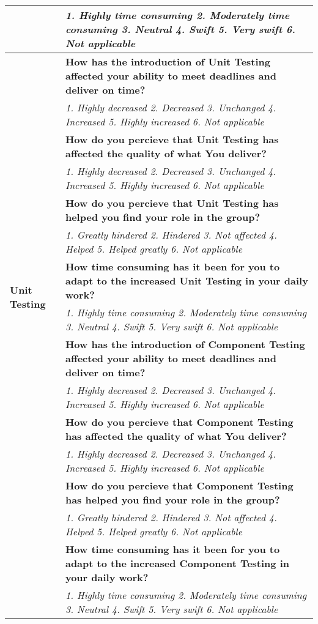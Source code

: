 \documentclass[final_report_innit.tex]{subfiles}
\begin{document}
\begin{center}
\begin{tabular}[b]{| p{4.5cm} | p{13cm} |}
	& \textit{1. Highly time consuming 2. Moderately time consuming 3. Neutral 4. Swift 5. Very swift 6. Not applicable} \\
	\hline
	\multirow{14}{*}{\textbf{Unit Testing}} & \cellcolor{greyOdd}\textbf{How has the introduction of Unit Testing affected your ability to meet deadlines and deliver on time?} \\ 
	& \textit{1. Highly decreased 2. Decreased 3. Unchanged 4. Increased 5. Highly increased 6. Not applicable} \\ \cline{2-2}
	& \cellcolor{greyOdd}\textbf{How do you percieve that Unit Testing has affected the quality of what You deliver?} \\
	& \textit{1. Highly decreased 2. Decreased 3. Unchanged 4. Increased 5. Highly increased 6. Not applicable} \\ \cline{2-2}
	& \cellcolor{greyOdd}\textbf{How do you percieve that Unit Testing has helped you find your role in the group?} \\
	& \textit{1. Greatly hindered 2. Hindered 3. Not affected 4. Helped 5. Helped greatly 6. Not applicable} \\ \cline{2-2}
	& \cellcolor{greyOdd}\textbf{How time consuming has it been for you to adapt to the increased Unit Testing in your daily work?} \\
	& \textit{1. Highly time consuming 2. Moderately time consuming 3. Neutral 4. Swift 5. Very swift 6. Not applicable} \\
	\hline
	\multirow{16}{*}{\textbf{Component Testing}} & \cellcolor{greyOdd}\textbf{How has the introduction of Component Testing affected your ability to meet deadlines and deliver on time?} \\ 
	& \textit{1. Highly decreased 2. Decreased 3. Unchanged 4. Increased 5. Highly increased 6. Not applicable} \\ \cline{2-2}
	& \cellcolor{greyOdd}\textbf{How do you percieve that Component Testing has affected the quality of what You deliver?} \\
	& \textit{1. Highly decreased 2. Decreased 3. Unchanged 4. Increased 5. Highly increased 6. Not applicable} \\ \cline{2-2}
	& \cellcolor{greyOdd}\textbf{How do you percieve that Component Testing has helped you find your role in the group?} \\
	& \textit{1. Greatly hindered 2. Hindered 3. Not affected 4. Helped 5. Helped greatly 6. Not applicable} \\ \cline{2-2}
	& \cellcolor{greyOdd}\textbf{How time consuming has it been for you to adapt to the increased Component Testing in your daily work?} \\
	& \textit{1. Highly time consuming 2. Moderately time consuming 3. Neutral 4. Swift 5. Very swift 6. Not applicable} \\
	\hline
\end{tabular}
\end{center}
\clearpage
\end{document}
